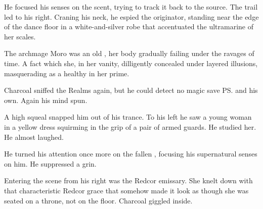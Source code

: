 \begin{garbage}

He focused his senses on the scent, trying to track it back to the source. The trail led to his right. Craning his neck, he espied the originator, standing near the edge of the dance floor in a white-and-silver robe that accentuated the ultramarine of her scales. 

 The archmage Moro \Cornel{} was an old \sphyle{}, her body gradually failing under the ravages of time. A fact which she, in her vanity, dilligently concealed under layered illusions, masquerading as a healthy \sphyle{} in her prime. 

Charcoal sniffed the Realms again, but he could detect no magic save \ps{\Cornel}{} and his own. 
 Again his mind spun.  

A high squeal snapped him out of his trance.
To his left he saw a young woman in a yellow dress squirming in the grip of a pair of armed guards. 
He studied her. 
He almost laughed. 

He turned his attention once more on the fallen \rayuth, focusing his supernatural senses on him. 
He suppressed a grin. 

Entering the scene from his right was the Redcor emissary. 
She knelt down with that characteristic Redcor grace that somehow made it look as though she was seated on a throne, not on the floor. Charcoal giggled inside. 


\end{garbage}
